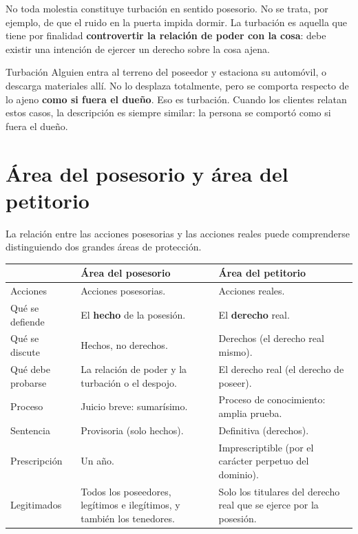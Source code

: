 \documentclass[12pt,oneside]{book}
\begin{document}
No toda molestia constituye turbación en sentido posesorio. No se trata, por ejemplo, de que el ruido en la puerta impida dormir. La turbación es aquella que tiene por finalidad \textbf{controvertir la relación de poder con la cosa}: debe existir una intención de ejercer un derecho sobre la cosa ajena.

\begin{ejemplo}{Turbación}
Alguien entra al terreno del poseedor y estaciona su automóvil, o descarga materiales allí. No lo desplaza totalmente, pero se comporta respecto de lo ajeno \textbf{como si fuera el dueño}. Eso es turbación. Cuando los clientes relatan estos casos, la descripción es siempre similar: la persona se comportó como si fuera el dueño.
\end{ejemplo}

\section{Área del posesorio y área del petitorio}

La relación entre las acciones posesorias y las acciones reales puede comprenderse distinguiendo dos grandes áreas de protección.

\begin{table}[H]
\centering
\begin{tabularx}{\textwidth}{@{}>{\raggedright\arraybackslash}p{}>{\raggedright\arraybackslash}X>{\raggedright\arraybackslash}X@{}}
\toprule
 & \textbf{Área del posesorio} & \textbf{Área del petitorio} \\
\midrule
Acciones & Acciones posesorias. & Acciones reales. \\
Qué se defiende & El \textbf{hecho} de la posesión. & El \textbf{derecho} real. \\
Qué se discute & Hechos, no derechos. & Derechos (el derecho real mismo). \\
Qué debe probarse & La relación de poder y la turbación o el despojo. & El derecho real (el derecho de poseer). \\
Proceso & Juicio breve: sumarísimo. & Proceso de conocimiento: amplia prueba. \\
Sentencia & Provisoria (solo hechos). & Definitiva (derechos). \\
Prescripción & Un año. & Imprescriptible (por el carácter perpetuo del dominio). \\
Legitimados & Todos los poseedores, legítimos e ilegítimos, y también los tenedores. & Solo los titulares del derecho real que se ejerce por la posesión. \\
\bottomrule
\end{tabularx}
\end{table}
\end{document}
